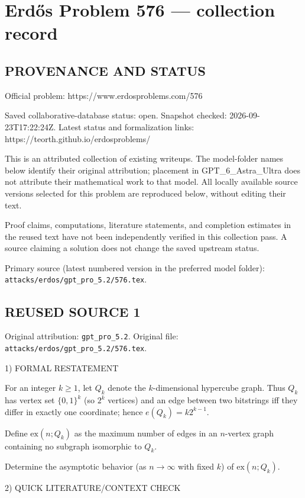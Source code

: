 \section*{Erd\H{o}s Problem 576 --- collection record}

\subsection*{PROVENANCE AND STATUS}
Official problem: https://www.erdosproblems.com/576

Saved collaborative-database status: open.
Snapshot checked: 2026-09-23T17:22:24Z.
Latest status and formalization links: https://teorth.github.io/erdosproblems/

This is an attributed collection of existing writeups. The model-folder names below identify their original attribution; placement in GPT\_6\_Astra\_Ultra does not attribute their mathematical work to that model. All locally available source versions selected for this problem are reproduced below, without editing their text.

Proof claims, computations, literature statements, and completion estimates in the reused text have not been independently verified in this collection pass. A source claiming a solution does not change the saved upstream status.

Primary source (latest numbered version in the preferred model folder): \texttt{attacks/erdos/gpt\_pro\_5.2/576.tex}.

\subsection*{REUSED SOURCE 1}
Original attribution: \texttt{gpt\_pro\_5.2}.
Original file: \texttt{attacks/erdos/gpt\_pro\_5.2/576.tex}.


1) FORMAL RESTATEMENT

For an integer $k\ge 1$, let $Q_k$ denote the $k$-dimensional hypercube graph.
Thus $Q_k$ has vertex set $\{0,1\}^k$ (so $2^k$ vertices) and an edge between two bitstrings iff they differ in exactly one coordinate; hence $e(Q_k)=k2^{k-1}$.

Define $\mathrm{ex}(n;Q_k)$ as the maximum number of edges in an $n$-vertex graph containing no subgraph isomorphic to $Q_k$.

Determine the asymptotic behavior (as $n\to\infty$ with fixed $k$) of $\mathrm{ex}(n;Q_k)$.

2) QUICK LITERATURE/CONTEXT CHECK

